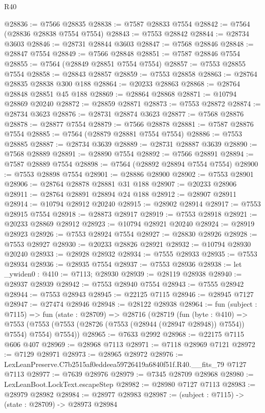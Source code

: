 \begin{lexlean}{R40}
\begin{coremodule}
@28836 := @7566 @28835
@28838 := @7587 @28833 @7554
@28842 := @7564 (@28836 @28838 @7554 @7554)
@28843 := @7553 @28842
@28844 := @28734 @3603
@28846 := @28731 @28844 @3603
@28847 := @7568 @28846
@28848 := @28847 @7554
@28849 := @7566 @28848
@28851 := @7587 @28846 @7554
@28855 := @7564 (@28849 @28851 @7554 @7554)
@28857 := @7553 @28855 @7554
@28858 := @28843 @28857
@28859 := @7553 @28858
@28863 := @28764 @28835 @28838 @300 @188
@28864 := @20233 @28863
@28868 := @28764 @28848 @28851 @45 @188
@28869 := @28864 @28868
@28871 := @10794 @28869 @20240
@28872 := @28859 @28871
@28873 := @7553 @28872
@28874 := @28734 @3623
@28876 := @28731 @28874 @3623
@28877 := @7568 @28876
@28878 := @28877 @7554
@28879 := @7566 @28878
@28881 := @7587 @28876 @7554
@28885 := @7564 (@28879 @28881 @7554 @7554)
@28886 := @7553 @28885
@28887 := @28734 @3639
@28889 := @28731 @28887 @3639
@28890 := @7568 @28889
@28891 := @28890 @7554
@28892 := @7566 @28891
@28894 := @7587 @28889 @7554
@28898 := @7564 (@28892 @28894 @7554 @7554)
@28900 := @7553 @28898 @7554
@28901 := @28886 @28900
@28902 := @7553 @28901
@28906 := @28764 @28878 @28881 @31 @188
@28907 := @20233 @28906
@28911 := @28764 @28891 @28894 @24 @188
@28912 := @28907 @28911
@28914 := @10794 @28912 @20240
@28915 := @28902 @28914
@28917 := @7553 @28915 @7554
@28918 := @28873 @28917
@28919 := @7553 @28918
@28921 := @20233 @28869 @28912
@28923 := @10794 @28921 @20240
@28924 := @28919 @28923
@28926 := @7553 @28924 @7554
@28927 := @28830 @28926
@28928 := @7553 @28927
@28930 := @20233 @28826 @28921
@28932 := @10794 @28930 @20240
@28933 := @28928 @28932
@28934 := @7555 @28933
@28935 := @7553 @28934
@28936 := @28935 @7554
@28937 := @7553 @28936
@28938 := let _ywiden0 : @410 := @7113; @28930
@28939 := @28119 @28938
@28940 := @28937 @28939
@28942 := @7553 @28940 @7554
@28943 := @7555 @28942
@28944 := @7553 @28943
@28945 := @22125 @7115
@28946 := @28945 @7127
@28947 := @27474 @28946
@28948 := @28122 @28938
@28964 := fun (subject : @7115) =>
  fun (state : @28709) =>
  @28716
    (@28719
      (fun (byte : @410) =>
      @7553 (@7553 (@7553 (@28726 (@7553 (@28944 (@28947 @28948)) @7554)) @7554) @7554) @7554))
@28965 := @7633 @2992
@28968 := @22175 @7115 @606 @407
@28969 := @28968 @7113
@28971 := @7118 @28969 @7121
@28972 := @7129 @28971
@28973 := @28965 @28972
@28976 := LexLeanPreserve.C7b2515af0eddeea59726419a6840f51f.R40.__fits_79 @7127 @7113
@28977 := @7639 @28976
@28979 := @7345 @28709 @28968
@28980 := LexLeanBoot.LockText.escapeStep
@28982 := @28980 @7127 @7113
@28983 := @28979 @28982
@28984 := @28977 @28983
@28987 := (subject : @7115) -> (state : @28709) -> @28973 @28984

\end{coremodule}
\end{lexlean}
